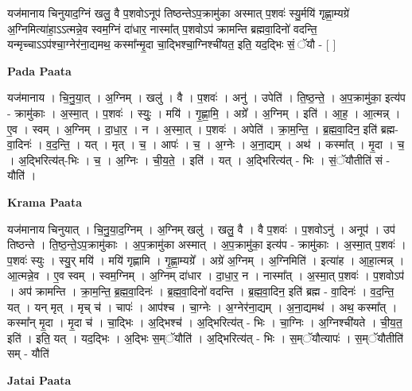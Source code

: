 \documentclass[17pt]{extarticle}
\begin{document}
यज॑मानाय चिनुयाद॒ग्निं खलु॒ वै प॒शवोऽनूप॑ तिष्ठन्तेऽप॒क्रामु॑का अस्मात् प॒शवः॑ स्यु॒र्मयि॑ गृह्णा॒म्यग्रे॑ अ॒ग्निमित्या॑हा॒ऽऽत्मन्ने॒व स्वम॒ग्निं दा॑धार॒ नास्मा᳚त् प॒शवोऽप॑ क्रामन्ति ब्रह्मवा॒दिनो॑ वदन्ति॒ यन्मृच्चाऽऽप॑श्चा॒ग्नेर॑ना॒द्यमथ॒ कस्मा᳚न्मृ॒दा चा॒द्भिश्चा॒ग्निश्ची॑यत॒ इति॒ यद॒द्भिः सं॒ ॅयौ - [  ] \newline

\textbf{Pada Paata} \newline

यज॑मानाय । चि॒नु॒या॒त् । अ॒ग्निम् । खलु॑ । वै । प॒शवः॑ । अनु॑ । उपेति॑ । ति॒ष्ठ॒न्ते॒ । अ॒प॒क्रामु॑का॒ इत्य॑प - क्रामु॑काः । अ॒स्मा॒त् । प॒शवः॑ । स्युः॒ । मयि॑ । गृ॒ह्णा॒मि॒ । अग्रे᳚ । अ॒ग्निम् । इति॑ । आ॒ह॒ । आ॒त्मन्न् । ए॒व । स्वम् । अ॒ग्निम् । दा॒धा॒र॒ । न । अ॒स्मा॒त् । प॒शवः॑ । अपेति॑ । क्रा॒म॒न्ति॒ । ब्र॒ह्म॒वा॒दिन॒ इति॑ ब्रह्म-वा॒दिनः॑ । व॒द॒न्ति॒ । यत् । मृत् । च॒ । आपः॑ । च॒ । अ॒ग्नेः । अ॒ना॒द्यम् । अथ॑ । कस्मा᳚त् । मृ॒दा । च॒ । अ॒द्भिरित्य॑त्-भिः । च॒ । अ॒ग्निः । ची॒य॒ते॒ । इति॑ । यत् । अ॒द्भिरित्य॑त् - भिः । सं॒ॅयौतीति॑ सं - यौति॑ ।  \newline


\textbf{Krama Paata} \newline

यज॑मानाय चिनुयात् । चि॒नु॒या॒द॒ग्निम् । अ॒ग्निम् खलु॑ । खलु॒ वै । वै प॒शवः॑ । प॒शवोऽनु॑ । अनूप॑ । उप॑ तिष्ठन्ते । ति॒ष्ठ॒न्ते॒ऽप॒क्रामु॑काः । अ॒प॒क्रामु॑का अस्मात् । अ॒प॒क्रामु॑का॒ इत्य॑प - क्रामु॑काः । अ॒स्मा॒त् प॒शवः॑ । प॒शवः॑ स्युः । स्यु॒र् मयि॑ । मयि॑ गृह्णामि । गृ॒ह्णा॒म्यग्रे᳚ । अग्रे॑ अ॒ग्निम् । अ॒ग्निमिति॑ । इत्या॑ह । आ॒हा॒त्मन्न् । आ॒त्मन्ने॒व । ए॒व स्वम् । स्वम॒ग्निम् । अ॒ग्निम् दा॑धार । दा॒धा॒र॒ न । नास्मा᳚त् । अ॒स्मा॒त् प॒शवः॑ । प॒शवोऽप॑ । अप॑ क्रामन्ति । क्रा॒म॒न्ति॒ ब्र॒ह्म॒वा॒दिनः॑ । ब्र॒ह्म॒वा॒दिनो॑ वदन्ति । ब्र॒ह्म॒वा॒दिन॒ इति॑ ब्रह्म - वा॒दिनः॑ । व॒द॒न्ति॒ यत् । यन् मृत् । मृच् च॑ । चापः॑ । आप॑श्च । चा॒ग्नेः । अ॒ग्नेर॑ना॒द्यम् । अ॒ना॒द्यमथ॑ । अथ॒ कस्मा᳚त् । कस्मा᳚न् मृ॒दा । मृ॒दा च॑ । चा॒द्भिः । अ॒द्भिश्च॑ । अ॒द्भिरित्य॑त् - भिः । चा॒ग्निः । अ॒ग्निश्ची॑यते । ची॒य॒त॒ इति॑ । इति॒ यत् । यद॒द्भिः । अ॒द्भिः स॒म्ॅयौति॑ । अ॒द्भिरित्य॑त् - भिः । स॒म्ॅयौत्यापः॑ । स॒म्ॅयौतीति॑ सम् - यौति॑ \newline

\textbf{Jatai Paata} \newline
\end{document}
